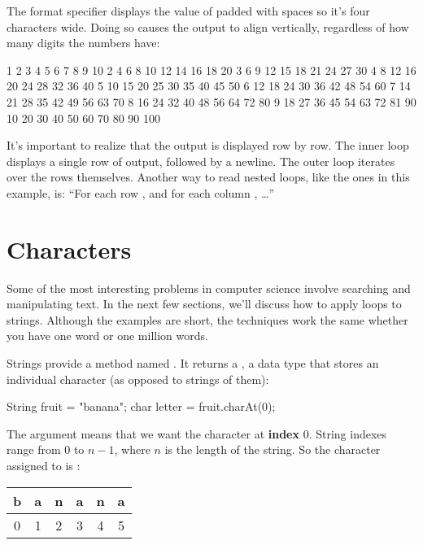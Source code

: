 
The format specifier  displays the value of  padded with spaces so it's four characters wide.
Doing so causes the output to align vertically, regardless of how many digits the numbers have:

\begin{stdout}
   1   2   3   4   5   6   7   8   9  10
   2   4   6   8  10  12  14  16  18  20
   3   6   9  12  15  18  21  24  27  30
   4   8  12  16  20  24  28  32  36  40
   5  10  15  20  25  30  35  40  45  50
   6  12  18  24  30  36  42  48  54  60
   7  14  21  28  35  42  49  56  63  70
   8  16  24  32  40  48  56  64  72  80
   9  18  27  36  45  54  63  72  81  90
  10  20  30  40  50  60  70  80  90 100
\end{stdout}

It's important to realize that the output is displayed row by row.
The inner loop displays a single row of output, followed by a newline.
The outer loop iterates over the rows themselves.
Another way to read nested loops, like the ones in this example, is: ``For each row , and for each column , \ldots''


\section{Characters}
\label{loops-strings_characters}

Some of the most interesting problems in computer science involve searching and manipulating text.
In the next few sections, we'll discuss how to apply loops to strings.
Although the examples are short, the techniques work the same whether you have one word or one million words.


Strings provide a method named .
It returns a , a data type that stores an individual character (as opposed to strings of them):

\begin{code}
String fruit = "banana";
char letter = fruit.charAt(0);
\end{code}

The argument  means that we want the character at {\bf index} 0.
String indexes range from 0 to $n-1$, where $n$ is the length of the string.
So the character assigned to  is :

\begin{center}
\ttfamily
\begin{tabular}{cccccc}
\hline
\multicolumn{1}{|l|}{b} & \multicolumn{1}{l|}{a} & \multicolumn{1}{l|}{n} & \multicolumn{1}{l|}{a} & \multicolumn{1}{l|}{n} & \multicolumn{1}{l|}{a} \\ \hline
0                       & 1                      & 2                      & 3                      & 4                      & 5
\end{tabular}
\end{center}

